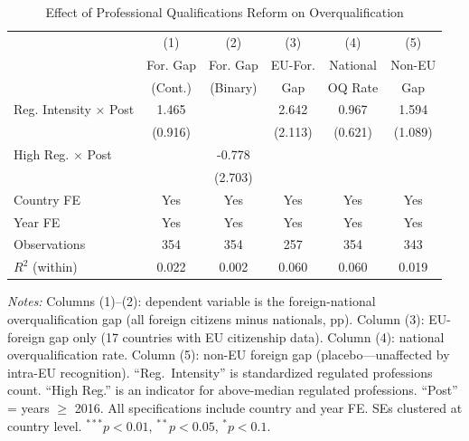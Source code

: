 \begin{table}[t]
\centering
\caption{Effect of Professional Qualifications Reform on Overqualification}
\label{tab:main}
\begin{tabular}{lccccc}
\toprule
 & (1) & (2) & (3) & (4) & (5) \\
 & For. Gap & For. Gap & EU-For. & National & Non-EU \\
 & (Cont.) & (Binary) & Gap & OQ Rate & Gap \\
\midrule
Reg. Intensity $\times$ Post & 1.465 & & 2.642 & 0.967 & 1.594 \\
 & (0.916) & & (2.113) & (0.621) & (1.089) \\
High Reg. $\times$ Post & & -0.778 & & & \\
 & & (2.703) & & & \\
\midrule
Country FE & Yes & Yes & Yes & Yes & Yes \\
Year FE & Yes & Yes & Yes & Yes & Yes \\
Observations & 354 & 354 & 257 & 354 & 343 \\
$R^2$ (within) & 0.022 & 0.002 & 0.060 & 0.060 & 0.019 \\
\bottomrule
\end{tabular}
\begin{tablenotes}[flushleft]\footnotesize
\item \textit{Notes:} Columns (1)--(2): dependent variable is the foreign-national overqualification gap (all foreign citizens minus nationals, pp). Column (3): EU-foreign gap only (17 countries with EU citizenship data). Column (4): national overqualification rate. Column (5): non-EU foreign gap (placebo---unaffected by intra-EU recognition). ``Reg.~Intensity'' is standardized regulated professions count. ``High Reg.'' is an indicator for above-median regulated professions. ``Post'' = years $\geq$ 2016. All specifications include country and year FE. SEs clustered at country level. $^{***}p<0.01$, $^{**}p<0.05$, $^{*}p<0.1$.
\end{tablenotes}
\end{table}
